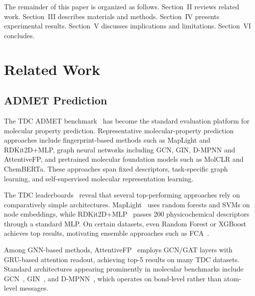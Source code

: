 \documentclass[journal]{IEEEtran}
\begin{document}
The remainder of this paper is organized as follows. Section~II reviews related work. Section~III describes materials and methods. Section~IV presents experimental results. Section~V discusses implications and limitations. Section~VI concludes.

\section{Related Work}
\label{sec:related}

\subsection{ADMET Prediction}

The TDC ADMET benchmark~\cite{huang2021therapeuticsdatacommonsmachine} has become the standard evaluation platform for molecular property prediction. Representative molecular-property prediction approaches include fingerprint-based methods such as MapLight and RDKit2D+MLP, graph neural networks including GCN, GIN, D-MPNN and AttentiveFP, and pretrained molecular foundation models such as MolCLR and ChemBERTa. These approaches span fixed descriptors, task-specific graph learning, and self-supervised molecular representation learning.

The TDC leaderboards~\cite{tdc_admet_leaderboard} reveal that several top-performing approaches rely on comparatively simple architectures. MapLight~\cite{maplight} uses random forests and SVMs on node embeddings, while RDKit2D+MLP~\cite{rdkit2d_mlp} passes 200 physicochemical descriptors through a standard MLP. On certain datasets, even Random Forest or XGBoost achieves top results, motivating ensemble approaches such as FCA~\cite{cfa}.

Among GNN-based methods, AttentiveFP~\cite{attentiveFP} employs GCN/GAT layers with GRU-based attention readout, achieving top-5 results on many TDC datasets. Standard architectures appearing prominently in molecular benchmarks include GCN~\cite{kipf2017gcn}, GIN~\cite{xu2019gin}, and D-MPNN~\cite{yang2019dmpnn}, which operates on bond-level rather than atom-level messages.
\end{document}
